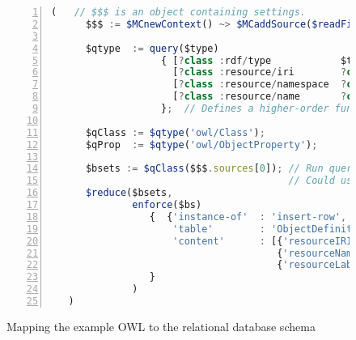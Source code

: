 \documentclass[9pt,letterpaper]{article}
\begin{document}
\begin{figure}[H]
  \caption{Mapping the example OWL to the relational database schema}
  \label{code:mapping-owl-to-rdbms}
\begin{lstlisting}[language=JavaScript,numberstyle=\scriptsize,basicstyle=\ttfamily\scriptsize,numbers=left,stepnumber=1,breaklines=true]
  (   // $$$ is an object containing settings.
      $$$ := $MCnewContext() ~> $MCaddSource($readFile('data/testing/owl-example.edn'));

      $qtype  := query($type)
                   { [?class :rdf/type            $type]
                     [?class :resource/iri        ?class-iri]
                     [?class :resource/namespace  ?class-ns]
                     [?class :resource/name       ?class-name]
                   };  // Defines a higher-order function

      $qClass := $qtype('owl/Class');
      $qProp  := $qtype('owl/ObjectProperty');

      $bsets := $qClass($$$.sources[0]); // Run query; return a collection of binding sets.
                                         // Could use ~> here; instead, I'm passing $bsets.
      $reduce($bsets,
              enforce($bs)
                 {  {'instance-of'  : 'insert-row',
                     'table'        : 'ObjectDefinition',
                     'content'      : [{'resourceIRI'       : ?class-iri},
                                       {'resourceNamespace' : ?class-ns},
                                       {'resourceLabel'     : ?class-name}]}
                 }
              )
   )
\end{lstlisting}
\end{figure}
\end{document}
